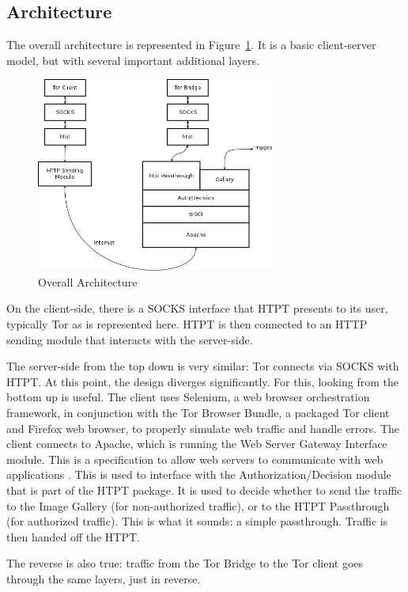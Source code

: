 \subsection{Architecture}
The overall architecture is represented in Figure~\ref{fig:overall_arch}. It is a basic client-server model, but with several important additional layers.

\begin{figure}[t]
\centering
\includegraphics[width=0.7\textwidth]{Overall_architecture}
\caption{Overall Architecture}
\label{fig:overall_arch}
\end{figure}

On the client-side, there is a SOCKS interface that HTPT presents to its user, typically Tor as is represented here. HTPT is then connected to an HTTP sending module that interacts with the server-side.

The server-side from the top down is very similar: Tor connects via SOCKS with HTPT. At this point, the design diverges significantly. For this, looking from the bottom up is useful. 
The client uses Selenium, a web browser orchestration framework, in conjunction with the Tor Browser Bundle, a packaged Tor client and Firefox web browser, to properly simulate web traffic and handle errors. 
The client connects to Apache, which is running the Web Server Gateway Interface module. This is a specification to allow web servers to communicate with web applications \cite{Ref16}. This is used to interface with the Authorization/Decision module that is part of the HTPT package. It is used to decide whether to send the traffic to the Image Gallery (for non-authorized traffic), or to the HTPT Passthrough (for authorized traffic). This is what it sounds: a simple passthrough. Traffic is then handed off the HTPT. 

The reverse is also true: traffic from the Tor Bridge to the Tor client goes through the same layers, just in reverse. 

